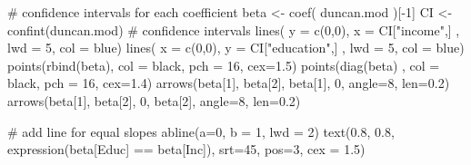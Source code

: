 \documentclass[
  letterpaper,
  10pt,
  krantz2]{krantz}
\makeatletter
\newenvironment{Shaded}{\begin{snugshade}}{\end{snugshade}}
\newcommand{\AttributeTok}[1]{\textcolor[rgb]{0.40,0.45,0.13}{#1}}
\newcommand{\CommentTok}[1]{\textcolor[rgb]{0.37,0.37,0.37}{#1}}
\newcommand{\DecValTok}[1]{\textcolor[rgb]{0.68,0.00,0.00}{#1}}
\newcommand{\FloatTok}[1]{\textcolor[rgb]{0.68,0.00,0.00}{#1}}
\newcommand{\FunctionTok}[1]{\textcolor[rgb]{0.28,0.35,0.67}{#1}}
\newcommand{\NormalTok}[1]{\textcolor[rgb]{0.00,0.23,0.31}{#1}}
\newcommand{\OtherTok}[1]{\textcolor[rgb]{0.00,0.23,0.31}{#1}}
\newcommand{\SpecialCharTok}[1]{\textcolor[rgb]{0.37,0.37,0.37}{#1}}
\newcommand{\StringTok}[1]{\textcolor[rgb]{0.13,0.47,0.30}{#1}}
\newenvironment{kframe}{%
  \medskip{}
  \setlength{\fboxsep}{.8em}
  \def\at@end@of@kframe{}%
  \ifinner\ifhmode%
  \def\at@end@of@kframe{\end{minipage}}%
  \begin{minipage}{\columnwidth}%
  \fi\fi%
  \def\FrameCommand##1{\hskip\@totalleftmargin \hskip-\fboxsep
  \colorbox{shadecolor}{##1}\hskip-\fboxsep
      \hskip-\linewidth \hskip-\@totalleftmargin \hskip\columnwidth}%
  \MakeFramed {\advance\hsize-\width
    \@totalleftmargin\z@ \linewidth\hsize
    \@setminipage}}%
{\par\unskip\endMakeFramed%
  \at@end@of@kframe}
\renewenvironment{Shaded}{\begin{kframe}}{\end{kframe}}
\makeatother
\begin{document}
{\begin{Shaded}
\begin{Highlighting}[]
\CommentTok{\# confidence intervals for each coefficient}
\NormalTok{beta }\OtherTok{\textless{}{-}} \FunctionTok{coef}\NormalTok{( duncan.mod )[}\SpecialCharTok{{-}}\DecValTok{1}\NormalTok{]}
\NormalTok{CI }\OtherTok{\textless{}{-}} \FunctionTok{confint}\NormalTok{(duncan.mod)       }\CommentTok{\# confidence intervals}
\FunctionTok{lines}\NormalTok{( }\AttributeTok{y =} \FunctionTok{c}\NormalTok{(}\DecValTok{0}\NormalTok{,}\DecValTok{0}\NormalTok{), }\AttributeTok{x =}\NormalTok{ CI[}\StringTok{"income"}\NormalTok{,] , }\AttributeTok{lwd =} \DecValTok{5}\NormalTok{, }\AttributeTok{col =} \StringTok{\textquotesingle{}blue\textquotesingle{}}\NormalTok{)}
\FunctionTok{lines}\NormalTok{( }\AttributeTok{x =} \FunctionTok{c}\NormalTok{(}\DecValTok{0}\NormalTok{,}\DecValTok{0}\NormalTok{), }\AttributeTok{y =}\NormalTok{ CI[}\StringTok{"education"}\NormalTok{,] , }\AttributeTok{lwd =} \DecValTok{5}\NormalTok{, }\AttributeTok{col =} \StringTok{\textquotesingle{}blue\textquotesingle{}}\NormalTok{)}
\FunctionTok{points}\NormalTok{(}\FunctionTok{rbind}\NormalTok{(beta), }\AttributeTok{col =} \StringTok{\textquotesingle{}black\textquotesingle{}}\NormalTok{, }\AttributeTok{pch =} \DecValTok{16}\NormalTok{, }\AttributeTok{cex=}\FloatTok{1.5}\NormalTok{)}
\FunctionTok{points}\NormalTok{(}\FunctionTok{diag}\NormalTok{(beta) , }\AttributeTok{col =} \StringTok{\textquotesingle{}black\textquotesingle{}}\NormalTok{, }\AttributeTok{pch =} \DecValTok{16}\NormalTok{, }\AttributeTok{cex=}\FloatTok{1.4}\NormalTok{)}
\FunctionTok{arrows}\NormalTok{(beta[}\DecValTok{1}\NormalTok{], beta[}\DecValTok{2}\NormalTok{], beta[}\DecValTok{1}\NormalTok{], }\DecValTok{0}\NormalTok{, }\AttributeTok{angle=}\DecValTok{8}\NormalTok{, }\AttributeTok{len=}\FloatTok{0.2}\NormalTok{)}
\FunctionTok{arrows}\NormalTok{(beta[}\DecValTok{1}\NormalTok{], beta[}\DecValTok{2}\NormalTok{], }\DecValTok{0}\NormalTok{, beta[}\DecValTok{2}\NormalTok{], }\AttributeTok{angle=}\DecValTok{8}\NormalTok{, }\AttributeTok{len=}\FloatTok{0.2}\NormalTok{)}

\CommentTok{\# add line for equal slopes}
\FunctionTok{abline}\NormalTok{(}\AttributeTok{a=}\DecValTok{0}\NormalTok{, }\AttributeTok{b =} \DecValTok{1}\NormalTok{, }\AttributeTok{lwd =} \DecValTok{2}\NormalTok{)}
\FunctionTok{text}\NormalTok{(}\FloatTok{0.8}\NormalTok{, }\FloatTok{0.8}\NormalTok{, }\FunctionTok{expression}\NormalTok{(beta[Educ] }\SpecialCharTok{==}\NormalTok{ beta[Inc]), }
     \AttributeTok{srt=}\DecValTok{45}\NormalTok{, }\AttributeTok{pos=}\DecValTok{3}\NormalTok{, }\AttributeTok{cex =} \FloatTok{1.5}\NormalTok{)}


\end{Highlighting}
\end{Shaded}}
\end{document}
